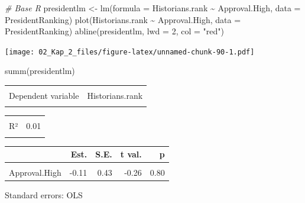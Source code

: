 \documentclass[
]{article}
\newenvironment{Shaded}{\begin{snugshade}}{\end{snugshade}}
\newcommand{\AttributeTok}[1]{\textcolor[rgb]{0.77,0.63,0.00}{#1}}
\newcommand{\CommentTok}[1]{\textcolor[rgb]{0.56,0.35,0.01}{\textit{#1}}}
\newcommand{\DecValTok}[1]{\textcolor[rgb]{0.00,0.00,0.81}{#1}}
\newcommand{\FunctionTok}[1]{\textcolor[rgb]{0.00,0.00,0.00}{#1}}
\newcommand{\NormalTok}[1]{#1}
\newcommand{\OtherTok}[1]{\textcolor[rgb]{0.56,0.35,0.01}{#1}}
\newcommand{\SpecialCharTok}[1]{\textcolor[rgb]{0.00,0.00,0.00}{#1}}
\newcommand{\StringTok}[1]{\textcolor[rgb]{0.31,0.60,0.02}{#1}}
\begin{document}
\begin{Shaded}
\begin{Highlighting}[]
\CommentTok{\# Base R}
\NormalTok{presidentlm }\OtherTok{\textless{}{-}} \FunctionTok{lm}\NormalTok{(}\AttributeTok{formula =}\NormalTok{ Historians.rank }\SpecialCharTok{\textasciitilde{}}\NormalTok{ Approval.High, }\AttributeTok{data =}\NormalTok{ PresidentRanking)}
\FunctionTok{plot}\NormalTok{(Historians.rank }\SpecialCharTok{\textasciitilde{}}\NormalTok{ Approval.High, }\AttributeTok{data =}\NormalTok{ PresidentRanking)}
\FunctionTok{abline}\NormalTok{(presidentlm, }\AttributeTok{lwd =} \DecValTok{2}\NormalTok{, }\AttributeTok{col =} \StringTok{"red"}\NormalTok{)}
\end{Highlighting}
\end{Shaded}

\texttt{[image: 02\_Kap\_2\_files/figure-latex/unnamed-chunk-90-1.pdf]}

\begin{Shaded}
\begin{Highlighting}[]
\FunctionTok{summ}\NormalTok{(presidentlm)}
\end{Highlighting}
\end{Shaded}

\begin{table}[!h]
\centering
\begin{tabular}{lr}
\toprule
\cellcolor{gray!6}{Observations} & \cellcolor{gray!6}{12}\\
Dependent variable & Historians.rank\\
\cellcolor{gray!6}{Type} & \cellcolor{gray!6}{OLS linear regression}\\
\bottomrule
\end{tabular}
\end{table} \begin{table}[!h]
\centering
\begin{tabular}{lr}
\toprule
\cellcolor{gray!6}{F(1,10)} & \cellcolor{gray!6}{0.07}\\
R² & 0.01\\
\cellcolor{gray!6}{Adj. R²} & \cellcolor{gray!6}{-0.09}\\
\bottomrule
\end{tabular}
\end{table} \begin{table}[!h]
\centering
\begin{threeparttable}
\begin{tabular}{lrrrr}
\toprule
  & Est. & S.E. & t val. & p\\
\midrule
\cellcolor{gray!6}{(Intercept)} & \cellcolor{gray!6}{25.81} & \cellcolor{gray!6}{33.91} & \cellcolor{gray!6}{0.76} & \cellcolor{gray!6}{0.46}\\
Approval.High & -0.11 & 0.43 & -0.26 & 0.80\\
\bottomrule
\end{tabular}
\begin{tablenotes}
\item Standard errors: OLS
\end{tablenotes}
\end{threeparttable}
\end{table}
\end{document}
